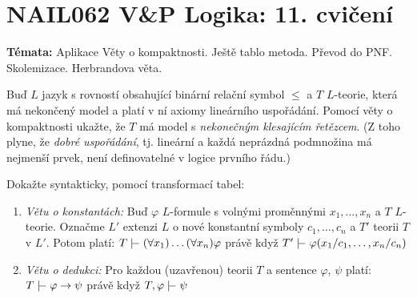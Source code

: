 \documentclass[a4paper,12pt]{article}
\begin{document}
\section*{NAIL062 V\&P Logika: 11. cvičení}


\textbf{Témata:} Aplikace Věty o kompaktnosti. Ještě tablo metoda. Převod do PNF. Skolemizace. Herbrandova věta.


\medskip\begin{problem} Buď $L$ jazyk s rovností obsahující binární relační symbol $\le$ a $T$ $L$-teorie, která má nekončený model a platí v ní axiomy lineárního uspořádání. Pomocí věty o kompaktnosti ukažte, že $T$ má model 
    s \emph{nekonečným klesajícím řetězcem}.
    (Z toho plyne, že \emph{dobré uspořádání}, tj. lineární a každá neprázdná podmnožina má nejmenší prvek, není definovatelné v logice prvního řádu.)
\end{problem}

\medskip\begin{problem} Dokažte syntakticky, pomocí transformací tabel:
    \begin{enumerate}
        \item {\it Větu o konstantách:} Buď $\varphi$ $L$-formule s volnými proměnnými $x_1,\dots,x_n$ a $T$ $L$-teorie. Označme $L'$ extenzi $L$ o nové konstantní symboly $c_1,\dots,c_n$ a $T'$ teorii $T$ v $L'$. Potom platí:
        $T \proves (\forall x_1)\dots(\forall x_n)\varphi$ právě když $T'\proves\varphi(x_1/c_1,\dots,x_n/c_n)$
        \item {\it Větu o dedukci:} Pro každou (uzavřenou) teorii $T$ a sentence $\varphi$, $\psi$ platí: $T\proves \varphi\to\psi$ právě když $T,\varphi\proves\psi$
    \end{enumerate}
    \end{problem} 
\end{document}
